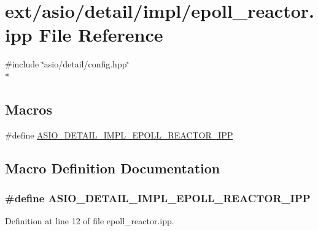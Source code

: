 \hypertarget{epoll__reactor_8ipp}{}\section{ext/asio/detail/impl/epoll\+\_\+reactor.ipp File Reference}
\label{epoll__reactor_8ipp}
{\ttfamily \#include \char`\"{}asio/detail/config.\+hpp\char`\"{}}\\*
\subsection*{Macros}
\begin{DoxyCompactItemize}
\item 
\#define \hyperlink{epoll__reactor_8ipp_ad8a57ddc1399de6e78f9f55663287cde}{A\+S\+I\+O\+\_\+\+D\+E\+T\+A\+I\+L\+\_\+\+I\+M\+P\+L\+\_\+\+E\+P\+O\+L\+L\+\_\+\+R\+E\+A\+C\+T\+O\+R\+\_\+\+I\+P\+P}
\end{DoxyCompactItemize}


\subsection{Macro Definition Documentation}
\hypertarget{epoll__reactor_8ipp_ad8a57ddc1399de6e78f9f55663287cde}{}
\subsubsection[{A\+S\+I\+O\+\_\+\+D\+E\+T\+A\+I\+L\+\_\+\+I\+M\+P\+L\+\_\+\+E\+P\+O\+L\+L\+\_\+\+R\+E\+A\+C\+T\+O\+R\+\_\+\+I\+P\+P}]{\setlength{\rightskip}{0pt plus 5cm}\#define A\+S\+I\+O\+\_\+\+D\+E\+T\+A\+I\+L\+\_\+\+I\+M\+P\+L\+\_\+\+E\+P\+O\+L\+L\+\_\+\+R\+E\+A\+C\+T\+O\+R\+\_\+\+I\+P\+P}\label{epoll__reactor_8ipp_ad8a57ddc1399de6e78f9f55663287cde}


Definition at line 12 of file epoll\+\_\+reactor.\+ipp.

